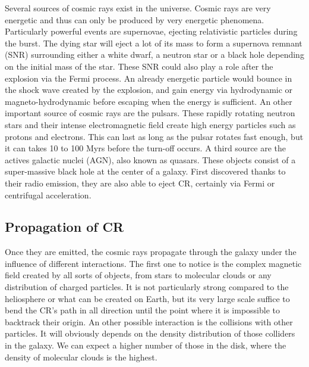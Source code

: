 Several sources of cosmic rays exist in the universe. Cosmic rays are very energetic and thus can only be produced by very energetic phenomena. Particularly powerful events are supernovae, ejecting relativistic particles during the burst. The dying star will eject a lot of its mass to form a supernova remnant (SNR) surrounding either a white dwarf, a neutron star or a black hole depending on the initial mass of the star. These SNR could also play a role after the explosion via the Fermi process. An already energetic particle would bounce in the shock wave created by the explosion, and gain energy via hydrodynamic or magneto-hydrodynamic before escaping when the energy is sufficient.
An other important source of cosmic rays are the pulsars. These rapidly rotating neutron stars and their intense electromagnetic field create high energy particles such as protons and electrons. This can last as long as the pulsar rotates fast enough, but it can takes 10 to 100 Myrs before the turn-off occurs.
A third source are the actives galactic nuclei (AGN), also known as quasars. These objects consist of a super-massive black hole at the center of a galaxy. First discovered thanks to their radio emission, they are also able to eject CR, certainly via Fermi or centrifugal acceleration.


\subsection{Propagation of CR}

Once they are emitted, the cosmic rays propagate through the galaxy under the influence of different interactions.
The first one to notice is the complex magnetic field created by all sorts of objects, from stars to molecular clouds or any distribution of charged particles. It is not particularly strong  compared to the heliosphere or what can be created on Earth, but its very large scale suffice to bend the CR's path in all direction until the point where it is impossible to backtrack their origin.
An other possible interaction is the collisions with other particles. It will obviously depends on the density distribution of those colliders in the galaxy. We can expect a higher number of those in the disk, where the density of molecular clouds is the highest.

